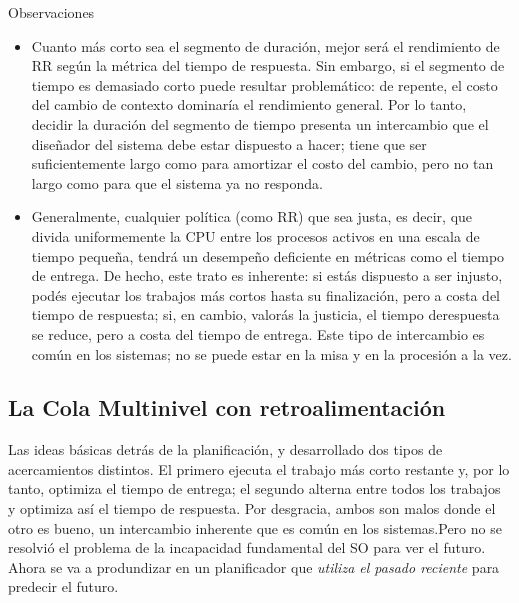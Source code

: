\documentclass{article}
\begin{document}
\begin{summary}{Observaciones}
    \begin{itemize}
        \item Cuanto más corto sea el segmento de duración, mejor será el rendimiento de RR según la métrica del tiempo de respuesta. Sin embargo, si el segmento de tiempo es demasiado corto puede resultar problemático: de repente, el costo del cambio de contexto dominaría el rendimiento general. Por lo tanto, decidir la duración del segmento de tiempo presenta un intercambio que el diseñador del sistema debe estar dispuesto a hacer; tiene que ser suficientemente largo como para amortizar el costo del cambio, pero no tan largo como para que el sistema ya no responda.
        \item Generalmente, cualquier política (como RR) que sea justa, es decir, que divida uniformemente la CPU entre los procesos activos en una escala de tiempo pequeña, tendrá un desempeño deficiente en métricas como el tiempo de entrega. De hecho, este trato es inherente: si estás dispuesto a ser injusto, podés ejecutar los trabajos más cortos hasta su finalización, pero a costa del tiempo de respuesta; si, en cambio, valorás la justicia, el tiempo derespuesta se reduce, pero a costa del tiempo de entrega. Este tipo de intercambio es común en los sistemas; no se puede estar en la misa y en la procesión a la vez.
    \end{itemize}
\end{summary}

\subsection{La Cola Multinivel con retroalimentación}
Las ideas básicas detrás de la planificación, y desarrollado dos tipos de acercamientos distintos. El primero ejecuta el trabajo más corto restante y, por lo tanto, optimiza el tiempo de entrega; el segundo alterna entre todos los trabajos y optimiza así el tiempo de respuesta. Por desgracia, ambos son malos donde el otro es bueno, un intercambio inherente que es común en los sistemas.Pero no se resolvió el problema de la incapacidad fundamental del SO para ver el futuro. Ahora se va a produndizar en un planificador que \textit{utiliza el pasado reciente} para predecir el futuro.
\end{document}
